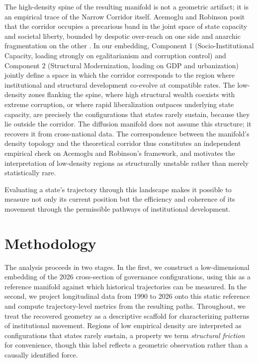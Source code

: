 \documentclass[12pt]{article}
\begin{document}
The high-density spine of the resulting manifold is not a geometric artifact; it is an empirical trace of the Narrow Corridor itself. Acemoglu and Robinson posit that the corridor occupies a precarious band in the joint space of state capacity and societal liberty, bounded by despotic over-reach on one side and anarchic fragmentation on the other \cite{acemoglu2019narrow}. In our embedding, Component 1 (Socio-Institutional Capacity, loading strongly on egalitarianism and corruption control) and Component 2 (Structural Modernization, loading on GDP and urbanization) jointly define a space in which the corridor corresponds to the region where institutional and structural development co-evolve at compatible rates. The low-density zones flanking the spine, where high structural wealth coexists with extreme corruption, or where rapid liberalization outpaces underlying state capacity, are precisely the configurations that states rarely sustain, because they lie outside the corridor. The diffusion manifold does not assume this structure; it recovers it from cross-national data. The correspondence between the manifold's density topology and the theoretical corridor thus constitutes an independent empirical check on Acemoglu and Robinson's framework, and motivates the interpretation of low-density regions as structurally unstable rather than merely statistically rare.

Evaluating a state's trajectory through this landscape makes it possible to measure not only its current position but the efficiency and coherence of its movement through the permissible pathways of institutional development.

\section{Methodology}

The analysis proceeds in two stages. In the first, we construct a low-dimensional embedding of the 2026 cross-section of governance configurations, using this as a reference manifold against which historical trajectories can be measured. In the second, we project longitudinal data from 1990 to 2026 onto this static reference and compute trajectory-level metrics from the resulting paths. Throughout, we treat the recovered geometry as a descriptive scaffold for characterizing patterns of institutional movement. Regions of low empirical density are interpreted as configurations that states rarely sustain, a property we term \textit{structural friction} for convenience, though this label reflects a geometric observation rather than a causally identified force.
\end{document}

